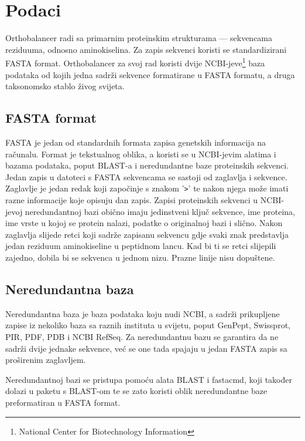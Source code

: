 \chapter{Podaci}
\label{chap:podaci}

Orthobalancer radi sa primarnim proteinskim strukturama --- sekvencama
reziduuma, odnosno aminokiselina. Za zapis sekvenci koristi se standardizirani
FASTA format. Orthobalancer za svoj rad koristi dvije
NCBI-jeve\footnote{National Center for Biotechnology Information} baza
podataka od kojih jedna sadrži sekvence formatirane u FASTA formatu, a druga
taksonomsko stablo živog svijeta.


\section{FASTA format}
\label{sec:fasta}

FASTA je jedan od standardnih formata zapisa genetskih informacija na računalu.
Format je tekstualnog oblika, a koristi se u NCBI-jevim alatima i bazama
podataka, poput BLAST-a i neredundantne baze proteinskih sekvenci. Jedan zapis u
datoteci s FASTA sekvencama se sastoji od zaglavlja i sekvence. Zaglavlje je
jedan redak koji započinje s znakom '\texttt{>}' te nakon njega može imati razne
informacije koje opisuju dan zapis. Zapisi proteinskih sekvenci u NCBI-jevoj
neredundantnoj bazi obično imaju jedinstveni ključ sekvence, ime proteina, ime
vrste u kojoj se protein nalazi, podatke o originalnoj bazi i slično. Nakon
zaglavlja slijede retci koji sadrže zapisanu sekvencu gdje svaki znak
predstavlja jedan reziduum aminokiseline u peptidnom lancu. Kad bi ti se retci
slijepili zajedno, dobila bi se sekvenca u jednom nizu. Prazne linije nisu
dopuštene.


\section{Neredundantna baza}
\label{sec:nrdb}

Neredundantna baza je baza podataka koju nudi NCBI, a sadrži prikupljene zapise
iz nekoliko baza sa raznih instituta u svijetu, poput GenPept, Swissprot, PIR,
PDF, PDB i NCBI RefSeq. Za neredundantnu bazu se garantira da ne sadrži dvije
jednake sekvence, već se one tada spajaju u jedan FASTA zapis sa proširenim
zaglavljem.

Neredundantnoj bazi se pristupa pomoću alata BLAST\cite{altschul1997gapped} i
fastacmd, koji također dolazi u paketu s BLAST-om te se zato koristi oblik
neredundantne baze preformatiran u FASTA format.


